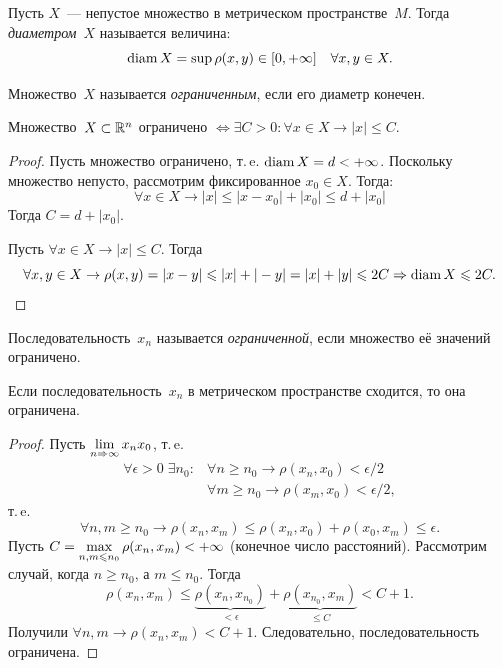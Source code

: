 \begin{definition}
Пусть \(X\)~--- непустое множество в метрическом пространстве~\(M\). Тогда \textit{диаметром}~\(X\)
называется величина:
\[
    \operatorname{diam} X = \sup \rho(x, y) \in [0, +\infty] \quad \forall x, y \in X.
\]
\end{definition}

\begin{definition}
Множество~\(X\) называется \textit{ограниченным}, если его диаметр конечен.
\end{definition}

\begin{statement}
Множество~\(X \subset \mathbb{R}^n\) ограничено \(\Longleftrightarrow \exists C > 0 \colon \forall x \in X
\rightarrow |x| \leq C\).
\end{statement}

\begin{proof}
\Boxedrightarrow Пусть множество ограничено, т.\,e. \(\operatorname{diam} X = d < +\infty\). Поскольку множество
непусто, рассмотрим фиксированное \(x_0 \in X\). Тогда:
\[
    \forall x \in X \rightarrow |x| \leq |x - x_0| + |x_0| \leq d + |x_0|
\]
Тогда \(C = d + |x_0|\).

\Boxedleftarrow Пусть \(\forall x \in X \rightarrow |x| \leq C\). Тогда
\[
    \forall x, y \in X \rightarrow \rho(x, y) = |x - y| \leqslant |x| + |-y| = |x| + |y| \leqslant 2C
        \Rightarrow \operatorname{diam} X \leqslant 2C.
\]
\end{proof}

\begin{definition}
Последовательность~\(x_n\) называется \textit{ограниченной}, если множество её значений ограничено.
\end{definition}

\begin{statement}
Если последовательность~\(x_n\) в метрическом пространстве сходится, то она ограничена.
\end{statement}

\begin{proof}
Пусть \(\displaystyle\lim_{n \Rightarrow \infty} x_n x_0\), т.\,e.
\begin{align}
    \forall \epsilon > 0 \;\exists n_0 \colon &\forall n \geq n_0 \rightarrow \rho(x_n, x_0) <
        \epsilon / 2\\
    &\forall m \geq n_0 \rightarrow \rho(x_m, x_0) < \epsilon / 2,
\end{align}
т.\,e.
\[
    \forall n, m \geq n_0 \rightarrow \rho(x_n, x_m) \leq \rho(x_n, x_0) + \rho(x_0, x_m) \leq
        \epsilon.
\]
Пусть \(\displaystyle C = \max_{n, m \leqslant n_0} \rho(x_n, x_m) < +\infty\) (конечное число расстояний).
Рассмотрим случай, когда \(n \geq n_0\), а \(m \leq n_0\). Тогда
\[
    \rho(x_n, x_m) \leq \underbrace{\rho(x_n, x_{n_0})}_{< \epsilon} + \underbrace{\rho(x_{n_0},
        x_m)}_{\leq C} < C + 1.
\]
Получили \(\forall n, m \rightarrow \rho(x_n, x_m) < C + 1\). Следовательно, последовательность
ограничена.
\end{proof}

